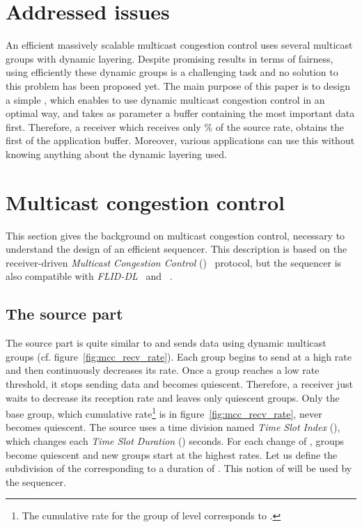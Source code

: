 \documentclass[a4paper]{article}
\begin{document}
\section{Addressed issues}
    An efficient massively scalable multicast congestion control uses several
    multicast groups with dynamic layering.  Despite promising results in terms
    of fairness, using efficiently these dynamic groups is a challenging task
    and no solution to this problem has been proposed yet.
The main purpose of this paper is to design a simple , which enables to
    use dynamic multicast congestion control in an optimal way, and takes as
    parameter a buffer containing the most important data first. Therefore, a
    receiver which receives only \% of the source rate, obtains the first
     of the application buffer.  Moreover, various applications can use
    this  without knowing anything about the dynamic layering used.

\section{Multicast congestion control}
    This section gives the background on multicast congestion control, necessary
    to understand the design of an efficient sequencer.  This description
    is based on the receiver-driven \textit{Multicast Congestion Control}
    ()~\cite{lucas_fair_2009} protocol, but the sequencer is also
    compatible with \textit{FLID-DL}~\cite{byers_flid-dl:_2002} and
    ~\cite{luby_wave_2002}.

    \subsection{The source part}
        The source part is quite similar to  and sends data using dynamic
        multicast groups (cf.  figure~\ref{fig:mcc_recv_rate}). Each group
        begins to send at a high rate and then continuously decreases its rate.
        Once a group reaches a low rate threshold, it stops sending data and
        becomes quiescent.  Therefore, a receiver just waits to decrease its
        reception rate and leaves only quiescent groups.  Only the base group,
        which cumulative rate\footnote{
            The cumulative rate for the group of level  corresponds to
                .
        }
        is  in figure~\ref{fig:mcc_recv_rate}, never becomes quiescent.
The source uses a time division named \textit{Time Slot Index} (),
        which changes each \textit{Time Slot Duration} () seconds. For
        each change of ,  groups become quiescent and  new groups
        start at the  highest rates. Let us define  the subdivision
        of the  corresponding to a duration of . This notion of
         will be used by the sequencer.
\end{document}
